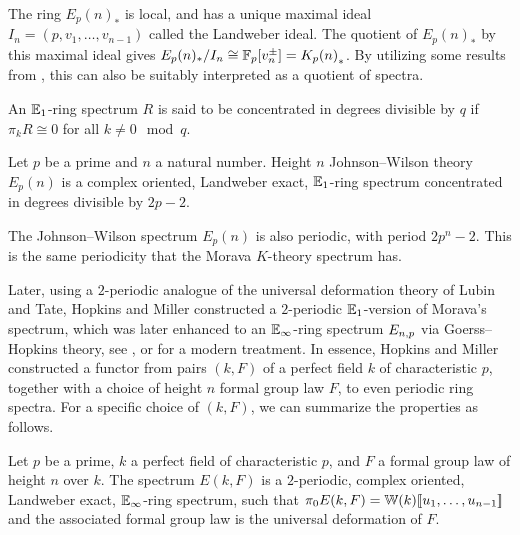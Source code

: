 \begin{remark}
    \label{ch0:rm:K-as-quotient-of-E}
    The ring $E_p(n)_*$ is local, and has a unique maximal ideal $I_n = (p, v_1, \ldots, v_{n-1})$ called the Landweber ideal. The quotient of $E_p(n)_*$ by this maximal ideal gives $E_p(n)_*/I_n \cong \mathbb{F}_p[v_n^{\pm}] = {K_p(n)}_*$. By utilizing some results from \cite{elmanto-kolderup_2020}, this can also be suitably interpreted as a quotient of spectra. 
\end{remark}

\begin{definition}
    An $\mathbb{E}_1$-ring spectrum $R$ is said to be concentrated in degrees divisible by $q$ if $\pi_k R \cong 0$ for all $k \not = 0 \mod q$. 
\end{definition}

\begin{proposition}
    \label{ch0:prop:Johnson-Wilson-properties}
    Let $p$ be a prime and $n$ a natural number. Height $n$ Johnson--Wilson theory $E_p(n)$ is a complex oriented, Landweber exact, $\mathbb{E}_1$-ring spectrum concentrated in degrees divisible by $2p-2$. 
\end{proposition}

\begin{remark}
    The Johnson--Wilson spectrum $E_p(n)$ is also periodic, with period $2p^n-2$. This is the same periodicity that the Morava $K$-theory spectrum has. 
\end{remark}

Later, using a $2$-periodic analogue of the universal deformation theory of Lubin and Tate, Hopkins and Miller constructed a $2$-periodic $\mathbb{E}_1$-version of Morava's spectrum, which was later enhanced to an $\mathbb{E}_\infty$-ring spectrum $E_{n,p}$ via Goerss--Hopkins theory, see \cite{goerss-hopkins_04}, or \cite{pstragowski_vankoughnett_2022} for a modern treatment. In essence, Hopkins and Miller constructed a functor from pairs $(k, F)$ of a perfect field $k$ of characteristic $p$, together with a choice of height $n$ formal group law $F$, to even periodic ring spectra. For a specific choice of $(k, F)$, we can summarize the properties as follows.  

\begin{proposition}
    Let $p$ be a prime, $k$ a perfect field of characteristic $p$, and $F$ a formal group law of height $n$ over $k$. The spectrum $E(k,F)$ is a $2$-periodic, complex oriented, Landweber exact, $\mathbb{E}_\infty$-ring spectrum, such that $\pi_0 E(k,F)=\mathbb{W}(k)[\![ u_1, \ldots, u_{n-1}]\!]$ and the associated formal group law is the universal deformation of $F$. 
\end{proposition}


